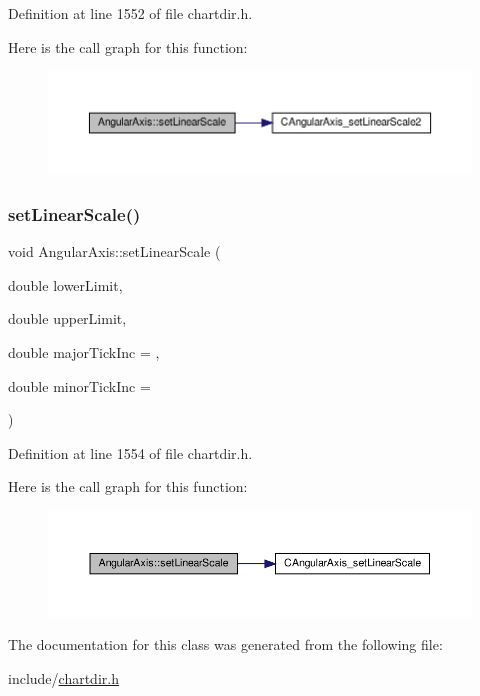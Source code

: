 Definition at line 1552 of file chartdir.\+h.

Here is the call graph for this function\+:
\nopagebreak
\begin{figure}[H]
\begin{center}
\leavevmode
\includegraphics[width=350pt]{class_angular_axis_a11fd9c97d2d76f01cec095a10edbe500_cgraph}
\end{center}
\end{figure}
\mbox{\label{class_angular_axis_a69bb45da8256fc6999eb4a7fe789ee10}} 
\subsubsection{\texorpdfstring{set\+Linear\+Scale()}{setLinearScale()}\hspace{0.1cm}{\footnotesize\ttfamily [2/2]}}
{\footnotesize\ttfamily void Angular\+Axis\+::set\+Linear\+Scale (\begin{DoxyParamCaption}\item[{double}]{lower\+Limit,  }\item[{double}]{upper\+Limit,  }\item[{double}]{major\+Tick\+Inc = {},  }\item[{double}]{minor\+Tick\+Inc = {} }\end{DoxyParamCaption})\hspace{0.3cm}{\ttfamily [inline]}}



Definition at line 1554 of file chartdir.\+h.

Here is the call graph for this function\+:
\nopagebreak
\begin{figure}[H]
\begin{center}
\leavevmode
\includegraphics[width=350pt]{class_angular_axis_a69bb45da8256fc6999eb4a7fe789ee10_cgraph}
\end{center}
\end{figure}


The documentation for this class was generated from the following file\+:\begin{DoxyCompactItemize}
\item 
include/\hyperlink{chartdir_8h}{chartdir.\+h}\end{DoxyCompactItemize}

